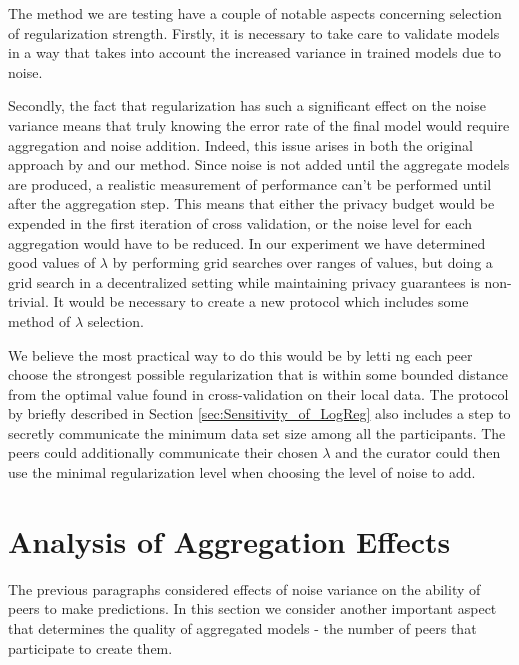 The method we are testing have a couple of notable aspects concerning selection of regularization strength. Firstly, it is necessary to take care to validate models in a way that takes into account the increased variance in trained models due to noise.

Secondly, the fact that regularization has such a significant effect on the noise variance means that truly knowing the error rate of the final model would require aggregation and noise addition. Indeed, this issue arises in both the original approach by \cite{pathak2010diffprivhomo} and our method. Since noise is not added until the aggregate models are produced, a realistic measurement of performance can't be performed until after the aggregation step. This means that either the privacy budget would be expended in the first iteration of cross validation, or the noise level for each aggregation would have to be reduced. In our experiment we have determined good values of $\lambda$ by performing grid searches over ranges of values, but doing a grid search in a decentralized setting while maintaining privacy guarantees is non-trivial. It would be necessary to create a new protocol which includes some method of $\lambda$ selection. 

We believe the most practical way to do this would be by letti	ng each peer choose the strongest possible regularization that is within some bounded distance from the optimal value found in cross-validation on their local data. The protocol by \cite{pathak2010diffprivhomo} briefly described in Section \ref{sec:Sensitivity_of_LogReg} also includes a step to secretly communicate the minimum data set size among all the participants. The peers could additionally communicate their chosen $\lambda$ and the curator could then use the minimal regularization level when choosing the level of noise to add.

\section{Analysis of Aggregation Effects}
\label{sec:aggregation_effects}

The previous paragraphs considered effects of noise variance on the ability of peers to make predictions. In this section we consider another important aspect that determines the quality of aggregated models - the number of peers that participate to create them. 

